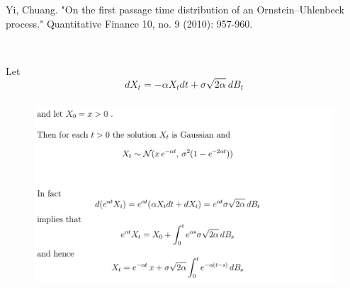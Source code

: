 \documentclass[c, dvipsnames, 8pt]{beamer}
\begin{document}
\begin{frame}[shrink=5]
	
	Yi, Chuang. "On the first passage time distribution of an Ornstein–Uhlenbeck process." Quantitative Finance 10, no. 9 (2010): 957-960.
	
	
	
	\
	
	Let 
	\begin{equation}\label{key}
	dX_t = -\alpha X_t dt +\sigma \sqrt{2\alpha} dB_t
	\end{equation}
	
	\frametitle{\insertsection} 
	\begin{figure}
		\centering
		\includegraphics[width=1\linewidth]{screenshot013}
		\label{fig:screenshot001}
	\end{figure}
	
	

	
	
\end{frame}
\end{document}
